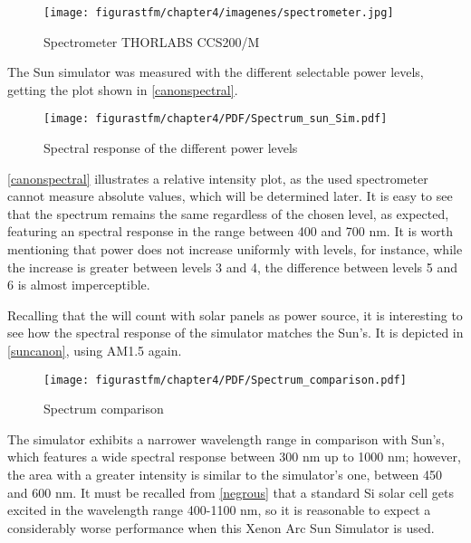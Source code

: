 \begin{figure}[H]
			\centering
			\texttt{[image: figurastfm/chapter4/imagenes/spectrometer.jpg]}
			\caption{Spectrometer THORLABS CCS200/M \cite{spectrometro}} \label{spetrometer} 
						\vspace{-1cm}

\end{figure}


The Sun simulator was measured with the different selectable power levels, getting the plot shown in \autoref{canonspectral}. 

\begin{figure}[H]
			\centering
			\texttt{[image: figurastfm/chapter4/PDF/Spectrum\_sun\_Sim.pdf]}
			\caption{Spectral response of the different power levels} \label{canonspectral}
\end{figure}

\autoref{canonspectral} illustrates a relative intensity plot, as the used spectrometer cannot measure absolute values, which will be determined later. It is easy to see that the spectrum remains the same regardless of the chosen level, as expected, featuring an spectral response in the range between 400 and 700 nm. It is worth mentioning that power does not increase uniformly with levels, for instance, while the increase is greater between levels 3 and 4, the difference between levels 5 and 6 is almost imperceptible.  

Recalling that the  will count with solar panels as power source, it is interesting to see how the spectral response of the simulator matches the Sun's. It is depicted in \autoref{suncanon}, using \acrshort{AM}1.5 again.


\begin{figure}[H]
			\centering
			\texttt{[image: figurastfm/chapter4/PDF/Spectrum\_comparison.pdf]}
			\caption{Spectrum comparison} \label{suncanon}
\end{figure}

The simulator exhibits a narrower wavelength range in comparison with Sun's, which features a wide spectral response between 300 nm up to 1000 nm; however, the area with a greater intensity is similar to the simulator's one, between 450 and 600 nm. It must be recalled from \autoref{negrous} that a standard Si solar cell gets excited in the wavelength range 400-1100 nm, so it is reasonable to expect a considerably worse performance when this Xenon Arc Sun Simulator is used.  

